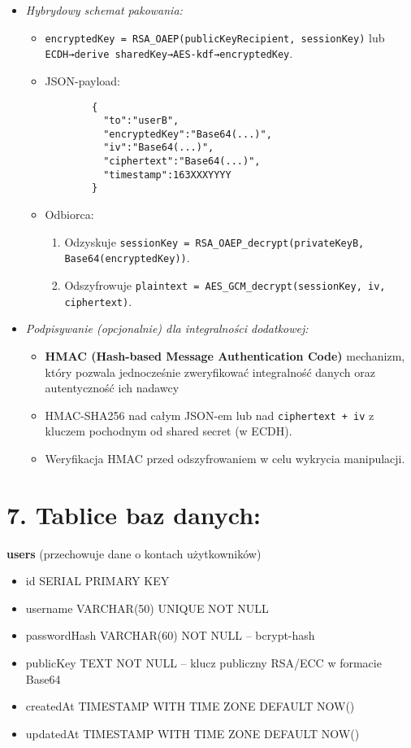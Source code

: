 \documentclass[a4paper,12pt]{article}
\begin{document}
\begin{itemize}
\begin{itemize}
        \item \emph{Hybrydowy schemat pakowania:}
        \begin{itemize}
            \item   \texttt{encryptedKey = RSA\_OAEP(publicKeyRecipient, sessionKey)} lub \texttt{ECDH→derive sharedKey→AES-kdf→encryptedKey}.
            \item   JSON-payload:
            \begin{verbatim}
        {
          "to":"userB",
          "encryptedKey":"Base64(...)",
          "iv":"Base64(...)",
          "ciphertext":"Base64(...)",
          "timestamp":163XXXYYYY
        }
            \end{verbatim}
            \item   Odbiorca:
            \begin{enumerate}
                \item   Odzyskuje \texttt{sessionKey = RSA\_OAEP\_decrypt(privateKeyB, Base64(encryptedKey))}.
                \item   Odszyfrowuje \texttt{plaintext = AES\_GCM\_decrypt(sessionKey, iv, ciphertext)}.
            \end{enumerate}
        \end{itemize}
        \item \emph{Podpisywanie (opcjonalnie) dla integralności dodatkowej:}
        \begin{itemize}
            \item \textbf{HMAC (Hash-based Message Authentication Code)} mechanizm, który pozwala jednocześnie zweryfikować integralność danych oraz autentyczność ich nadawcy
            \item HMAC-SHA256 nad całym JSON-em lub nad \texttt{ciphertext + iv} z kluczem pochodnym od shared secret (w ECDH).
            \item Weryfikacja HMAC przed odszyfrowaniem w celu wykrycia manipulacji.
        \end{itemize}
    \end{itemize}
\end{itemize}

\section*{7. Tablice baz danych:}

\textbf{users} (przechowuje dane o kontach użytkowników)
\begin{itemize}
    \item id SERIAL PRIMARY KEY
    \item username VARCHAR(50) UNIQUE NOT NULL
    \item passwordHash VARCHAR(60) NOT NULL  – bcrypt-hash
    \item publicKey TEXT NOT NULL  – klucz publiczny RSA/ECC w formacie Base64
    \item createdAt TIMESTAMP WITH TIME ZONE DEFAULT NOW()
    \item updatedAt TIMESTAMP WITH TIME ZONE DEFAULT NOW()
\end{itemize}
\end{document}
